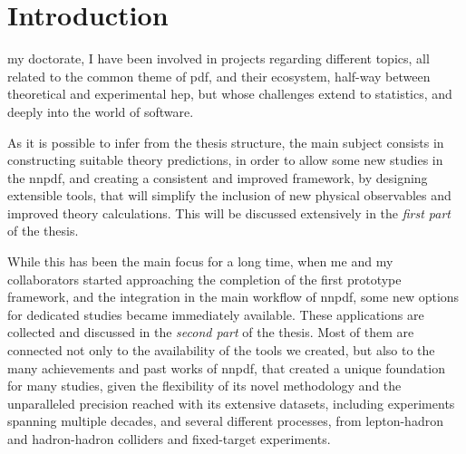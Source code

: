 
\cleardoublepage
{}

\chapter*{Introduction}
%
	{}

 my doctorate, I have been involved in projects regarding
different topics, all related to the common theme of \acrfull{pdf}, and their
ecosystem, half-way between theoretical and experimental \acrfull{hep}, but
whose challenges extend to statistics, and deeply into the world of software.

As it is possible to infer from the thesis structure, the main subject
consists in constructing suitable theory predictions, in order to allow some
new studies in the \acrlong{nnpdf}, and creating a consistent and improved
framework, by designing extensible tools, that will simplify the inclusion of
new physical observables and improved theory calculations.
This will be discussed extensively in the \textit{first part} of the thesis.

While this has been the main focus for a long time, when me and my
collaborators started approaching the completion of the first prototype
framework, and the integration in the main workflow of \acrshort{nnpdf}, some
new options for dedicated studies became immediately available.
These applications are collected and discussed in the \textit{second part} of
the thesis.
Most of them are connected not only to the availability of the tools we
created, but also to the many achievements and past works of \acrshort{nnpdf},
that created a unique foundation for many studies, given the flexibility of its
novel methodology and the unparalleled precision reached with its extensive
datasets, including experiments spanning multiple decades, and several
different processes, from lepton-hadron and hadron-hadron colliders and
fixed-target experiments.
